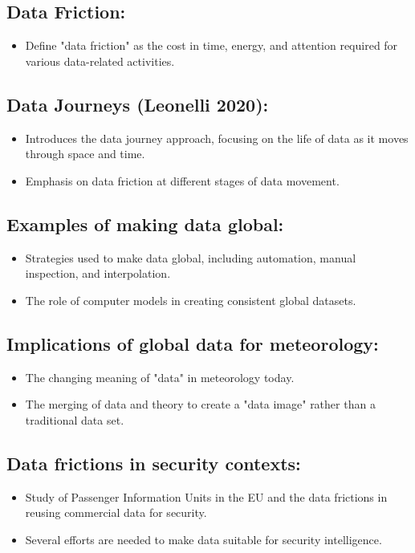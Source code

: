 \documentclass{article}
\begin{document}
\subsection*{Data Friction:}
\begin{itemize}
    \item Define "data friction" as the cost in time, energy, and attention required for various data-related activities.
\end{itemize}

\subsection*{Data Journeys (Leonelli 2020):}
\begin{itemize}
    \item Introduces the data journey approach, focusing on the life of data as it moves through space and time.
    \item Emphasis on data friction at different stages of data movement.
\end{itemize}

\subsection*{Examples of making data global:}
\begin{itemize}
    \item Strategies used to make data global, including automation, manual inspection, and interpolation.
    \item The role of computer models in creating consistent global datasets.
\end{itemize}

\subsection*{Implications of global data for meteorology:}
\begin{itemize}
    \item The changing meaning of "data" in meteorology today.
    \item The merging of data and theory to create a "data image" rather than a traditional data set.
\end{itemize}

\subsection*{Data frictions in security contexts:}
\begin{itemize}
    \item Study of Passenger Information Units in the EU and the data frictions in reusing commercial data for security.
    \item Several efforts are needed to make data suitable for security intelligence.
\end{itemize}
\end{document}
